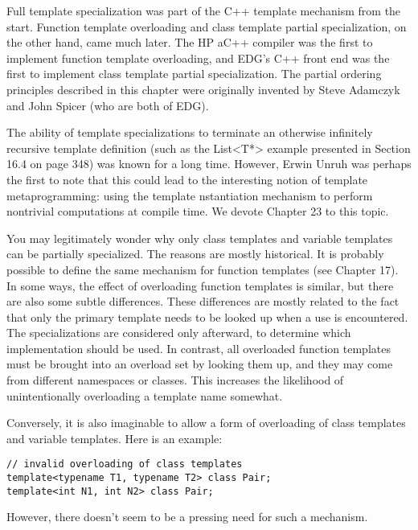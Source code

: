 Full template specialization was part of the C++ template mechanism from the start. Function template overloading and class template partial specialization, on the other hand, came much later. The HP aC++ compiler was the first to implement function template overloading, and EDG’s C++ front end was the first to implement class template partial specialization. The partial ordering principles described in this chapter were originally invented by Steve Adamczyk and John Spicer (who are both of EDG).

The ability of template specializations to terminate an otherwise infinitely recursive template definition (such as the List<T*> example presented in Section 16.4 on page 348) was known for a long time. However, Erwin Unruh was perhaps the first to note that this could lead to the interesting notion of template metaprogramming: using the template nstantiation mechanism to perform nontrivial computations at compile time. We devote Chapter 23 to this topic.

You may legitimately wonder why only class templates and variable templates can be partially specialized. The reasons are mostly historical. It is probably possible to define the same mechanism for function templates (see Chapter 17). In some ways, the effect of overloading function templates is similar, but there are also some subtle differences. These differences are mostly related to the fact that only the primary template needs to be looked up when a use is encountered. The specializations are considered only afterward, to determine which implementation should be used. In contrast, all overloaded function templates must be brought into an overload set by looking them up, and they may come from different namespaces or classes. This increases the likelihood of unintentionally overloading a template name somewhat.

Conversely, it is also imaginable to allow a form of overloading of class templates and variable templates. Here is an example:


\begin{lstlisting}[style=styleCXX]
// invalid overloading of class templates
template<typename T1, typename T2> class Pair;
template<int N1, int N2> class Pair;
\end{lstlisting}

However, there doesn’t seem to be a pressing need for such a mechanism.